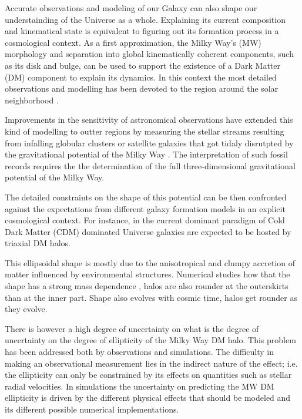 \documentclass[a4paper,fleqn,usenatbib]{mnras}
\begin{document}
Accurate observations and modeling of our Galaxy can also
shape our understainding of the Universe as a whole.  
Explaining its current composition and kinematical state is 
equivalent to figuring out its formation process in a cosmological
context. 
As a first approximation, the Milky Way's (MW) morphology and
separation into global kinematically coherent components, such as its
disk and bulge, can be used to support the  existence of a Dark Matter
(DM) component to explain its dynamics. 
In this context the most detailed observations and modelling has been
devoted to the region around the solar neighborhood
\citep{2000MNRAS.311..361O,2009PASJ...61..227S,2010JCAP...08..004C,2013ApJ...779..115B,Iocco15}. 

Improvements in the sensitivity of astronomical observations have 
extended this kind of modelling to outter regions by measuring
the stellar streams resulting from infalling globular clusters or
satellite galaxies that got tidaly disrutpted by the gravitational
potential of the Milky Way
\citep{1998ApJ...495..297J,1999MNRAS.307..495H, 1999MNRAS.307..877T}. 
The interpretation of such fossil records requires the the
determination of the full three-dimensional gravitational potential of
the Milky  Way.

The detailed constraints on the shape of this potential can be then
confronted against the expectations from different galaxy formation
models in an explicit cosmological context.
For instance, in the current dominant paradigm of Cold Dark Matter
(CDM) dominated Universe galaxies are expected to be hosted by
triaxial DM halos.

This ellipsoidal shape is mostly due to the anisotropical and
clumpy accretion of matter influenced by environmental structures.
Numerical studies how that the shape has a strong mass dependence
\citep{Allgood_et_al._2006}, halos are also rounder at the outerskirts
than at the inner part. 
Shape also evolves with cosmic time, halos get
rounder as they evolve.  

There is however a high degree of uncertainty on what is the degree of
uncertainty on the degree of ellipticity of the Milky Way DM halo.
This problem has been addressed both by observations and simulations.
The difficulty in making an observational measurement lies in the
indirect nature of the effect; i.e. the ellipticity can only be
constrained by its effects on quantities such as stellar radial
velocities.
In simulations the uncertainty on predicting the MW DM ellipticity is 
driven by the different physical effects that should be modeled and
its different possible numerical implementations.
\end{document}
